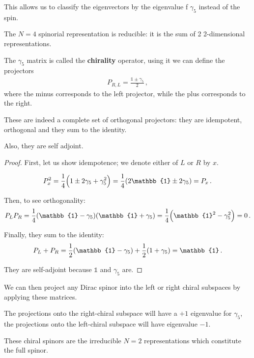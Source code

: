 \documentclass[main.tex]{subfiles}
\begin{document}
This allows us to classify the eigenvectors by the eigenvalue f \(\gamma_5 \) instead of the spin.

The \(N=4\) spinorial representation is reducible: it is the sum of 2 2-dimensional representations.

The \(\gamma_5 \) matrix is called the \textbf{chirality} operator, using it we can define the projectors 
%
\begin{align}
P_{R, L} = \frac{\mathbb{1} \pm \gamma_5 }{2}
\,,
\end{align}
%
where the minus corresponds to the left projector, while the plus corresponds to the right.

\begin{claim}
These are indeed a complete set of orthogonal projectors: they are idempotent, orthogonal and they sum to the identity.

Also, they are self adjoint.
\end{claim}

\begin{proof}
First, let us show idempotence; we denote either of \(L\) or \(R\) by \(x\).

\begin{align}
P_x^2 = \frac{1}{4} \qty(1 \pm 2 \gamma_5  + \gamma_5^2)
= \frac{1}{4} \qty(2 \mathbb{1} \pm 2 \gamma_5 ) = P_x
\,.
\end{align}

Then, to see orthogonality: 
%
\begin{align}
P_L P_R = \frac{1}{4} \qty(\mathbb{1} - \gamma_5 ) \qty(\mathbb{1} + \gamma_5 ) = \frac{1}{4} \qty(\mathbb{1}^2 - \gamma_5^2) = 0
\,.
\end{align}

Finally, they sum to the identity: 
%
\begin{align}
P_L + P_R = \frac{1}{2} \qty(\mathbb{1} - \gamma_5 ) + \frac{1}{2} \qty(1 + \gamma_5) = \mathbb{1}
\,.
\end{align}

They are self-adjoint because \(\mathbb{1}\) and \(\gamma_5 \) are.
\end{proof}

We can then project any Dirac spinor into the left or right chiral subspaces by applying these matrices. 

The projections onto the right-chiral subspace will have a \(+1 \) eigenvalue for \(\gamma_5 \), the projections onto the left-chiral subspace will have eigenvalue \(-1\).

These chiral spinors are the irreducible \(N=2\) representations which constitute the full spinor.
\end{document}
